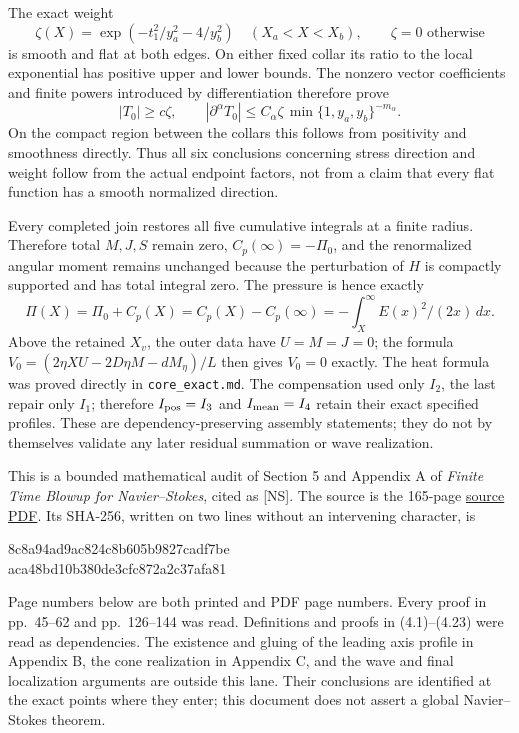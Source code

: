 \documentclass[10pt,a4paper]{article}
\begin{document}
The exact weight
\[
\zeta(X)=\exp(-t_1^2/y_a^2-4/y_b^2)\quad(X_a<X<X_b),\qquad \zeta=0\text{ otherwise}
\]
is smooth and flat at both edges. On either fixed collar its ratio to the local exponential has positive upper and lower bounds. The nonzero vector coefficients and finite powers introduced by differentiation therefore prove
\[
|T_0|\ge c\zeta,\qquad
|\partial^\alpha T_0|\le C_\alpha\zeta\,
\min\{1,y_a,y_b\}^{-m_\alpha}.
\]
On the compact region between the collars this follows from positivity and smoothness directly. Thus all six conclusions concerning stress direction and weight follow from the actual endpoint factors, not from a claim that every flat function has a smooth normalized direction.

Every completed join restores all five cumulative integrals at a finite radius. Therefore total \(M,J,S\) remain zero, \(C_p(\infty)=-\Pi_0\), and the renormalized angular moment remains unchanged because the perturbation of \(H\) is compactly supported and has total integral zero. The pressure is hence exactly
\[
\Pi(X)=\Pi_0+C_p(X)=C_p(X)-C_p(\infty)
=-\int_X^\infty E(x)^2/(2x)\,dx.
\]
Above the retained \(X_v\), the outer data have \(U=M=J=0\); the formula
\(V_0=(2\eta XU-2D\eta M-dM_\eta)/L\)
then gives \(V_0=0\) exactly. The heat formula was proved directly in \texttt{core\_exact.md}. The compensation used only \(I_2\), the last repair only \(I_1\); therefore \(I_{\rm pos}=I_3\) and \(I_{\rm mean}=I_4\) retain their exact specified profiles. These are dependency-preserving assembly statements; they do not by themselves validate any later residual summation or wave realization.




\noindent This is a bounded mathematical audit of Section 5 and Appendix A of
\emph{Finite Time Blowup for Navier--Stokes}, cited as [NS]. The source is the
165-page \href{https://cdn.openai.com/pdf/32d9f210-8b73-45e0-91bc-82a30aef8a9a/navier-stokes.pdf}{source PDF}.
Its SHA-256, written on two lines without an intervening character, is
\begin{center}\ttfamily
8c8a94ad9ac824c8b605b9827cadf7be\\
aca48bd10b380de3cfc872a2c37afa81
\end{center}
Page numbers below are both printed and PDF page numbers. Every proof in pp.~45--62
and pp.~126--144 was read. Definitions and proofs in (4.1)--(4.23) were read as
dependencies. The existence and gluing of the leading axis profile in Appendix B,
the cone realization in Appendix C, and the wave and final localization arguments
are outside this lane. Their conclusions are identified at the exact points where
they enter; this document does not assert a global Navier--Stokes theorem.
\end{document}
